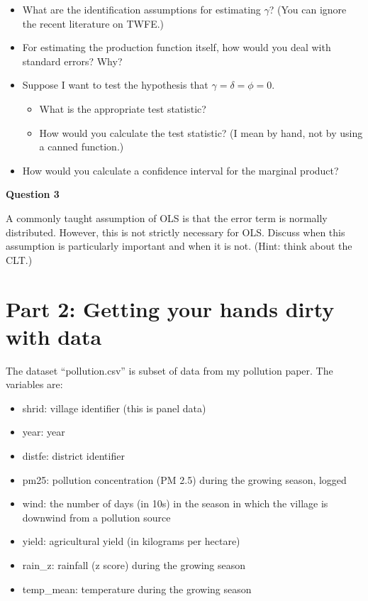 \documentclass[
]{article}
\providecommand{\tightlist}{%
  \setlength{\itemsep}{0pt}\setlength{\parskip}{0pt}}
\begin{document}
\begin{itemize}
\tightlist
\item
  What are the identification assumptions for estimating \(\gamma\)? (You can ignore the recent literature on TWFE.)
\item
  For estimating the production function itself, how would you deal with standard errors? Why?
\item
  Suppose I want to test the hypothesis that \(\gamma=\delta=\phi=0\).

  \begin{itemize}
  \tightlist
  \item
    What is the appropriate test statistic?
  \item
    How would you calculate the test statistic? (I mean by hand, not by using a canned function.)
  \end{itemize}
\item
  How would you calculate a confidence interval for the marginal product?
\end{itemize}

\textbf{Question 3}

A commonly taught assumption of OLS is that the error term is normally distributed. However, this is not strictly necessary for OLS. Discuss when this assumption is particularly important and when it is not. (Hint: think about the CLT.)

\hypertarget{part-2-getting-your-hands-dirty-with-data}{%
\section{Part 2: Getting your hands dirty with data}\label{part-2-getting-your-hands-dirty-with-data}}

The dataset ``pollution.csv'' is subset of data from my pollution paper. The variables are:

\begin{itemize}
\tightlist
\item
  shrid: village identifier (this is panel data)
\item
  year: year
\item
  distfe: district identifier
\item
  pm25: pollution concentration (PM 2.5) during the growing season, logged
\item
  wind: the number of days (in 10s) in the season in which the village is downwind from a pollution source
\item
  yield: agricultural yield (in kilograms per hectare)
\item
  rain\_z: rainfall (z score) during the growing season
\item
  temp\_mean: temperature during the growing season
\end{itemize}
\end{document}

